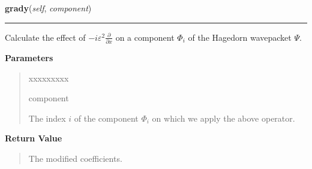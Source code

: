 \hspace{.8\funcindent}\begin{boxedminipage}{\funcwidth}

    \raggedright \textbf{grady}(\textit{self}, \textit{component})

    \vspace{-1.5ex}

    \rule{\textwidth}{0.5\fboxrule}
\setlength{\parskip}{2ex}
    Calculate the effect of $-i \varepsilon^2
    \frac{\partial}{\partial x}$ on a
    component $\Phi_i$ of the Hagedorn wavepacket
    $\Psi$.

\setlength{\parskip}{1ex}
      \textbf{Parameters}
      \vspace{-1ex}

      \begin{quote}
        \begin{Ventry}{xxxxxxxxx}

          \item[component]

          The index $i$ of the component $\Phi_i$ on
          which we apply the above operator.

        \end{Ventry}

      \end{quote}

      \textbf{Return Value}
    \vspace{-1ex}

      \begin{quote}
      The modified coefficients.

      \end{quote}

    \end{boxedminipage}

    \label{HagedornWavepacket:HagedornWavepacket:project_to_canonical}

    \vspace{0.5ex}

